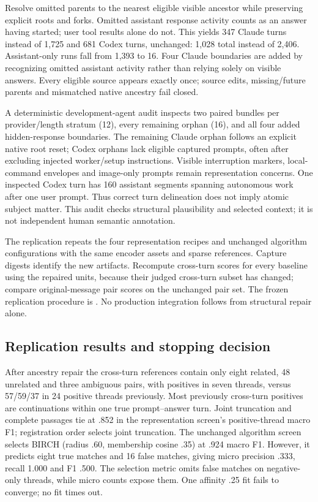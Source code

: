 \documentclass[11pt]{article}
\begin{document}
Resolve omitted parents to the nearest eligible visible ancestor while
preserving explicit roots and forks. Omitted assistant response activity counts
as an answer having started; user tool results alone do not. This yields 347
Claude turns instead of 1,725 and 681 Codex turns, unchanged: 1,028 total instead
of 2,406. Assistant-only runs fall from 1,393 to 16. Four Claude boundaries are
added by recognizing omitted assistant activity rather than relying solely on
visible answers. Every eligible source appears exactly once; source edits,
missing/future parents and mismatched native ancestry fail closed.

A deterministic development-agent audit inspects two paired bundles per
provider/length stratum (12), every remaining orphan (16), and all four added
hidden-response boundaries. The remaining Claude orphan follows an explicit
native root reset; Codex orphans lack eligible captured prompts, often after
excluding injected worker/setup instructions. Visible interruption markers,
local-command envelopes and image-only prompts remain representation concerns.
One inspected Codex turn has 160 assistant segments spanning autonomous work
after one user prompt. Thus correct turn delineation does not imply atomic
subject matter. This audit checks structural plausibility and selected context;
it is not independent human semantic annotation.

The replication repeats the four representation recipes and unchanged
algorithm configurations with the same encoder assets and sparse references.
Capture digests identify the new artifacts. Recompute cross-turn scores for
every baseline using the repaired units, because their judged cross-turn subset
has changed; compare original-message pair scores on the unchanged pair set.
The frozen replication procedure is
. No production integration follows from
structural repair alone.

\subsection{Replication results and stopping decision}
After ancestry repair the cross-turn references contain only eight related,
48 unrelated and three ambiguous pairs, with positives in seven threads,
versus 57/59/37 in 24 positive threads previously. Most previously cross-turn
positives are continuations within one true prompt--answer turn. Joint
truncation and complete passages tie at .852 in the representation screen's
positive-thread macro F1; registration order selects joint truncation. The
unchanged algorithm screen selects BIRCH (radius .60, membership cosine .35)
at .924 macro F1. However, it predicts eight true matches and 16 false matches,
giving micro precision .333, recall 1.000 and F1 .500. The selection metric
omits false matches on negative-only threads, while micro counts expose them.
One affinity .25 fit fails to converge; no fit times out.
\end{document}
